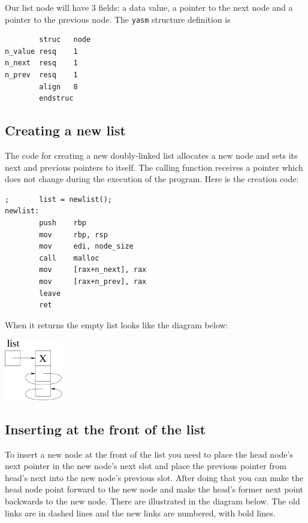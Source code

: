 \documentclass[11pt,b5paper]{book}
\begin{document}
Our list node will have 3 fields: a data value, a pointer to the next node and
a pointer to the previous node.
The {\tt yasm} structure definition is
\begin{verbatim}
        struc   node
n_value resq    1
n_next  resq    1
n_prev  resq    1
        align   8
        endstruc
\end{verbatim}

\subsection{Creating a new list}

The code for creating a new doubly-linked list allocates a new node and sets its next and previous pointers to
itself.
The calling function receives a pointer which does not change during the execution of the program.
Here is the creation code:
\begin{verbatim}
;       list = newlist();
newlist:
        push    rbp
        mov     rbp, rsp
        mov     edi, node_size
        call    malloc
        mov     [rax+n_next], rax
        mov     [rax+n_prev], rax
        leave
        ret
\end{verbatim}

When it returns the empty list looks like the diagram below:

\begin{center}
\includegraphics[width=1.0in]{empty_doubly_linked_list.pdf}
\end{center}

\subsection{Inserting at the front of the list}

To insert a new node at the front of the list you need to place the
head node's next pointer in the new node's next slot and place the
previous pointer from head's next into the new node's previous slot.
After doing that you can make the head node point forward to the new
node and make the head's former next point backwards to the new node.
There are illustrated in the diagram below.
The old links are in dashed lines and the new links are numbered,
with bold lines.
\end{document}
